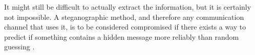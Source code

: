 It might still be difficult to actually extract the information, but it is certainly not impossible.
A steganographic method, and therefore any communication channel that uses it, is to be considered compromised if there exists a way to predict if something contains a hidden message more reliably than random guessing \citep{Bohme2004}.
